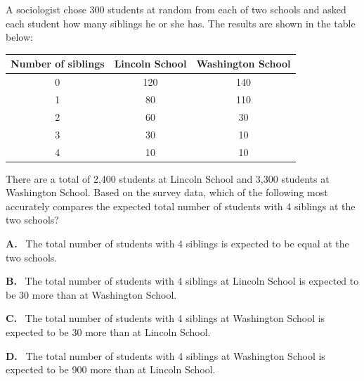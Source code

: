 \documentclass[12pt]{article}
\newcommand{\choicebox}[2]{%
  \begin{tcolorbox}[
    colback=white, 
    colframe=novelblue,
    boxrule=0.5pt, 
    rounded corners=4pt, 
    left=6pt, right=6pt, top=6pt, bottom=6pt,
    width=\linewidth
  ]
  \textbf{#1.} \ #2
  \end{tcolorbox}
}
\begin{document}
A sociologist chose 300 students at random from each of two schools and asked each student how many siblings he or she has. The results are shown in the table below:

\begin{center}
\begin{tabular}{|c|c|c|}
\hline
\textbf{Number of siblings} & \textbf{Lincoln School} & \textbf{Washington School} \\
\hline
0 & 120 & 140 \\
1 & 80 & 110 \\
2 & 60 & 30 \\
3 & 30 & 10 \\
4 & 10 & 10 \\
\hline
\end{tabular}
\end{center}

There are a total of 2,400 students at Lincoln School and 3,300 students at Washington School. Based on the survey data, which of the following most accurately compares the expected total number of students with 4 siblings at the two schools?

\vspace{0.75em}

\choicebox{A}{The total number of students with 4 siblings is expected to be equal at the two schools.}  
\choicebox{B}{The total number of students with 4 siblings at Lincoln School is expected to be 30 more than at Washington School.}  
\choicebox{C}{The total number of students with 4 siblings at Washington School is expected to be 30 more than at Lincoln School.}  
\choicebox{D}{The total number of students with 4 siblings at Washington School is expected to be 900 more than at Lincoln School.}
\end{document}

